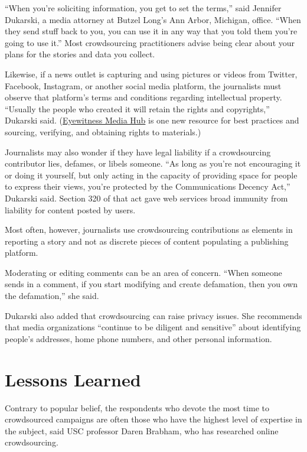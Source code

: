 \begin{itemize}
``When you’re soliciting information, you get to set the terms,'' said Jennifer Dukarski, a media attorney at Butzel Long’s Ann Arbor, Michigan, office. ``When they send stuff back to you, you can use it in any way that you told them you’re going to use it.''\autocite{Dukarski} Most crowdsourcing practitioners advise being clear about your plans for the stories and data you collect.

Likewise, if a news outlet is capturing and using pictures or videos from Twitter, Facebook, Instagram, or another social media platform, the journalists must observe that platform’s terms and conditions regarding intellectual property. ``Usually the people who created it will retain the rights and copyrights,'' Dukarski said. (\href{http://eyewitnessmediahub.com/%5D}{Eyewitness Media Hub} is one new resource for best practices and sourcing, verifying, and obtaining rights to materials.)\autocite{EyewitnessMediaHub}

Journalists may also wonder if they have legal liability if a crowdsourcing contributor lies, defames, or libels someone. ``As long as you’re not encouraging it or doing it yourself, but only acting in the capacity of providing space for people to express their views, you’re protected by the Communications Decency Act,'' Dukarski said. Section 320 of that act gave web services broad immunity from liability for content posted by users. 

Most often, however, journalists use crowdsourcing contributions as elements in reporting a story and not as discrete pieces of content populating a publishing platform.

Moderating or editing comments can be an area of concern. ``When someone sends in a comment, if you start modifying and create defamation, then you own the defamation,'' she said.

Dukarski also added that crowdsourcing can raise privacy issues. She recommends that media organizations ``continue to be diligent and sensitive'' about identifying people’s addresses, home phone numbers, and other personal information. 


\chapter{Lessons Learned} 

Contrary to popular belief, the respondents who devote the most time to crowdsourced campaigns are often those who have the highest level of expertise in the subject, said USC professor Daren Brabham, who has researched online crowdsourcing. 


\end{itemize}
